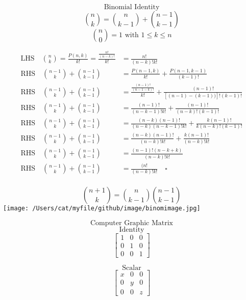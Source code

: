 \documentclass[10pt]{article}
\begin{document}
\[ \text{Binomial Identity} \] 
\[  \binom{n}{k} = \binom{n}{k-1} + \binom{n-1}{k-1} \] 
\[ \binom{n}{0} = 1 \text{ with } 1 \leq k \leq n\] 

\begin{equation}
\begin{aligned}
    \text{LHS} \quad \binom{n}{k} = \frac{P(n, k)}{k!} = \frac{\frac{n!}{(n-k)!}}{k!} &= \frac{n!}{(n-k)! k!}\\
    \text{RHS} \quad \binom{n-1}{k} + \binom{n-1}{k-1} &= \frac{P(n-1, k)}{k!} + \frac{P(n-1, k-1)}{(k-1)!}  \\  
    \text{RHS} \quad \binom{n-1}{k} + \binom{n-1}{k-1} &= \frac{\frac{(n-1)!}{(n-1-k)!}}{k!} + \frac{(n-1)!}{[(n-1)-(k-1))]!(k-1)!}\\    
    \text{RHS} \quad \binom{n-1}{k} + \binom{n-1}{k-1} &= \frac{(n-1)!}{(n-k-1)!k!} + \frac{(n-1)!}{(n-k)!(k-1)!}\\    
    \text{RHS} \quad \binom{n-1}{k} + \binom{n-1}{k-1} &= \frac{(n-k)(n-1)!}{(n-k)(n-k-1)!k!} + \frac{k(n-1)!}{k(n-k)!(k-1)!}\\    
    \text{RHS} \quad \binom{n-1}{k} + \binom{n-1}{k-1} &= \frac{(n-k)(n-1)!}{(n-k)!k!} + \frac{k(n-1)!}{(n-k)!k!}\\    
    \text{RHS} \quad \binom{n-1}{k} + \binom{n-1}{k-1} &= \frac{(n-1)!(n-k+k)}{(n-k)!k!}\\    
    \text{RHS} \quad \binom{n-1}{k} + \binom{n-1}{k-1} &= \frac{(n!}{(n-k)!k!} \nonumber \quad \square\\    
\end{aligned}
\end{equation}

\newpage
\[  \binom{n+1}{k} = \binom{n}{k-1} \binom{n-1}{k-1} \] 
\texttt{[image: /Users/cat/myfile/github/image/binomimage.jpg]}

\newpage
\[\text{Computer Graphic Matrix} \]
\[\text{Identity}\]
\[
        \begin{bmatrix}
            1 & 0 & 0\\
            0 & 1 & 0\\   
            0 & 0 & 1  
        \end{bmatrix}
\]

\[ \text{Scalar} \]
\[
        \begin{bmatrix}
            x & 0 & 0\\
            0 & y & 0\\   
            0 & 0 & z  
        \end{bmatrix}
\]
\end{document}
